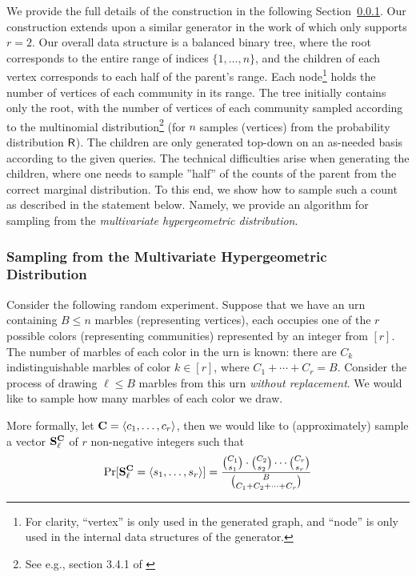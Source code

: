 We provide the full details of the construction in the following Section~\ref{sec:partition}.
Our construction extends upon a similar generator in the work of \cite{huge} which only supports $r = 2$.
Our overall data structure is a balanced binary tree,
where the root corresponds to the entire range of indices $\{1, \ldots, n\}$,
and the children of each vertex corresponds to each half of the parent's range.
Each node\footnote{For clarity, ``vertex'' is only used in the generated graph,
and ``node'' is only used in the internal data structures of the generator.}
holds the number of vertices of each community in its range.
The tree initially contains only the root,
with the number of vertices of each community sampled according
to the multinomial distribution\footnote{See e.g., section 3.4.1 of \cite{knuth}}
(for $n$ samples (vertices) from the probability distribution $\mathsf{R}$).
The children are only generated top-down on an as-needed basis according to the given queries.
The technical difficulties arise when generating the children,
where one needs to sample ''half'' of the counts of the parent from the correct marginal distribution.
To this end, we show how to sample such a count as described in the statement below.
Namely, we provide an algorithm for sampling from the \emph{multivariate hypergeometric distribution}.

\subsubsection{Sampling from the Multivariate Hypergeometric Distribution}
\label{sec:partition}

Consider the following random experiment. Suppose that we have an urn containing $B \leq n$ marbles (representing vertices), each occupies one of the $r$ possible colors (representing communities) represented by an integer from $[r]$. The number of marbles of each color in the urn is known: there are $C_k$ indistinguishable marbles of color $k \in [r]$, where $C_1 + \cdots + C_r = B$. Consider the process of drawing $\ell \leq B$ marbles from this urn \emph{without replacement}. We would like to sample how many marbles of each color we draw.

More formally, let $\mathbf{C} = \langle c_1, \ldots, c_r \rangle$, then we would like to (approximately) sample a vector $\mathbf{S}^{\mathbf{C}}_\ell$ of $r$ non-negative integers such that
\[\Pr[\mathbf{S}^{\mathbf{C}}_\ell = \langle s_1, \ldots, s_r \rangle]
= \frac{{C_1\choose s_1}\cdot{C_2\choose s_2}\cdots{C_r\choose s_r}}{{B \choose C_1+C_2+ \cdots +C_r}}\]

